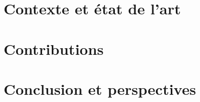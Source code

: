 \documentclass{these-dbl}
\begin{document}



\clearemptydoublepage


\clearemptydoublepage


\frontmatter
\clearemptydoublepage
\renewcommand{\contentsname}{Table des matières}
\tableofcontents %

\clearemptydoublepage


\part{Contexte et état de l'art}
\label{part:one}

\clearemptydoublepage
\mainmatter


\clearemptydoublepage


\part{Contributions}
\label{part:two}

\clearemptydoublepage


\clearemptydoublepage


\clearemptydoublepage


\part{Conclusion et perspectives}
\label{part:three}

\clearemptydoublepage
\backmatter

\end{document}
